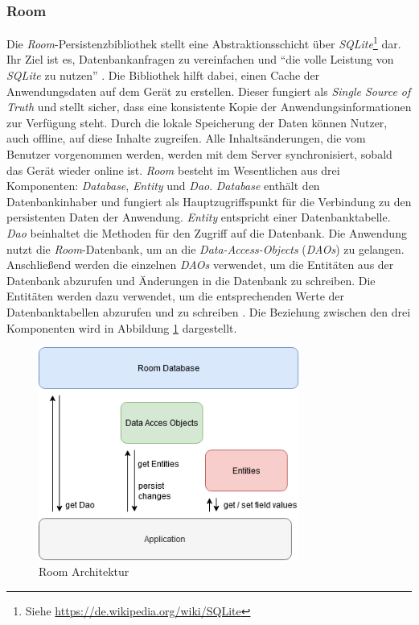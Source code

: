 \documentclass[a4paper]{article}
\begin{document}
\subsubsection{Room}
\label{subsubsec:technologies:bibs:room}
Die \textit{Room}-Persistenzbibliothek stellt eine Abstraktionsschicht über \textit{SQLite}\footnote{Siehe \url{https://de.wikipedia.org/wiki/SQLite}} dar.
Ihr Ziel ist es, Datenbankanfragen zu vereinfachen und "`die volle Leistung von \textit{SQLite} zu nutzen"' \autocite{android_room_architecture}.
Die Bibliothek hilft dabei, einen Cache der Anwendungsdaten auf dem Gerät zu erstellen.
Dieser fungiert als \textit{Single Source of Truth} und stellt sicher, dass eine konsistente Kopie der Anwendungsinformationen zur Verfügung steht.
Durch die lokale Speicherung der Daten können Nutzer, auch offline, auf diese Inhalte zugreifen.
Alle Inhaltsänderungen, die vom Benutzer vorgenommen werden, werden mit dem Server synchronisiert, sobald das Gerät wieder online ist.\newline
\textit{Room} besteht im Wesentlichen aus drei Komponenten: \textit{Database}, \textit{Entity} und \textit{Dao}.
\textit{Database} enthält den Datenbankinhaber und fungiert als Hauptzugriffspunkt für die Verbindung zu den persistenten Daten der Anwendung.
\textit{Entity} entspricht einer Datenbanktabelle.
\textit{Dao} beinhaltet die Methoden für den Zugriff auf die Datenbank.
Die Anwendung nutzt die \textit{Room}-Datenbank, um an die \textit{Data-Access-Objects} (\textit{DAOs}) zu gelangen.
Anschließend werden die einzelnen \textit{DAOs} verwendet, um die Entitäten aus der Datenbank abzurufen und Änderungen in die Datenbank zu schreiben.
Die Entitäten werden dazu verwendet, um die entsprechenden Werte der Datenbanktabellen abzurufen und zu schreiben \autocite{android_room_data_storage}.
Die Beziehung zwischen den drei Komponenten wird in Abbildung \ref{fig:room} dargestellt.

\begin{figure}[H]
	\centering
	\includegraphics[height=7cm,keepaspectratio]{./images/Room.png}
	\caption{Room Architektur}
	\label{fig:room}
\end{figure}
\end{document}
